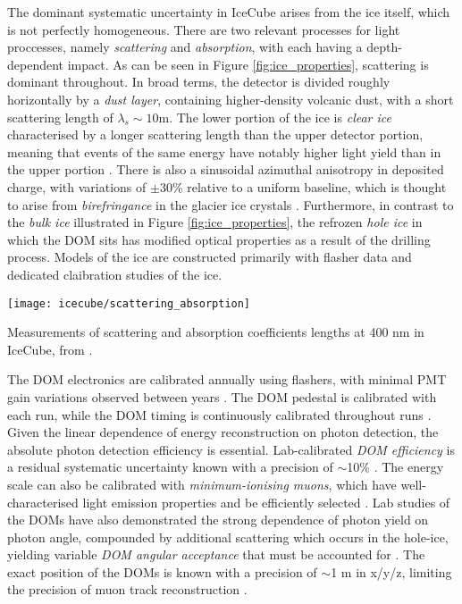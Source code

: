 The dominant systematic uncertainty in IceCube arises from the ice itself, which is not perfectly homogeneous. There are two relevant processes for light proccesses, namely \emph{scattering} and \emph{absorption}, with each having a depth-dependent impact. As can be seen in Figure \ref{fig:ice_properties}, scattering is dominant throughout. In broad terms, the detector is divided roughly horizontally by a \emph{dust layer}, containing higher-density volcanic dust, with a short scattering length of $\lambda_{s} \sim 10$m. The lower portion of the ice is \emph{clear ice} characterised by a longer scattering length than the upper detector portion, meaning that events of the same energy have notably higher light yield than in the upper portion . There is also a sinusoidal azimuthal anisotropy in deposited charge, with variations of $\pm$30\% relative to a uniform baseline, which is thought to arise from \emph{birefringance} in the glacier ice crystals . Furthermore, in contrast to the \emph{bulk ice} illustrated in Figure \ref{fig:ice_properties}, the refrozen \emph{hole ice} in which the DOM sits has modified optical properties as a result of the drilling process. Models of the ice are constructed primarily with flasher data and dedicated claibration studies of the ice.

\begin{marginfigure}
	\centering \texttt{[image: icecube/scattering\_absorption]}
	\caption{Measurements of scattering and absorption coefficients lengths at 400 nm in IceCube, from \cite{coenders_thesis}.}
	\label{fig:ice_properties}
\end{marginfigure}

The DOM electronics are calibrated annually using flashers, with minimal PMT gain variations observed between years \cite{icecube_detector_17}. The DOM pedestal is calibrated with each run, while the DOM timing is continuously calibrated throughout runs  \cite{icecube_detector_17}. Given the linear dependence of energy reconstruction on photon detection, the absolute photon detection efficiency is essential.  Lab-calibrated \emph{DOM efficiency} is a residual systematic uncertainty known with a precision of $\sim$10\% \cite{icecube_detector_17}. The energy scale can also be calibrated with \emph{minimum-ionising muons}, which have well-characterised light emission properties and be efficiently selected \cite{ic_energy_reco_14}. Lab studies of the DOMs have also demonstrated the strong dependence of photon yield on photon angle, compounded by additional scattering which occurs in the hole-ice, yielding variable \emph{DOM angular acceptance} that must be accounted for . The exact position of the DOMs is known with a precision of $\sim$1 m in x/y/z, limiting the precision of muon track reconstruction \cite{icecube_detector_17}.

